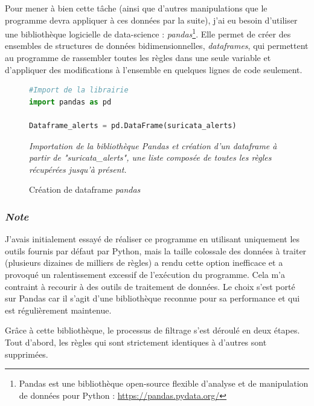 \vspace{1em}

Pour mener à bien cette tâche (ainsi que d'autres manipulations que le programme devra appliquer à ces données par la suite), j'ai eu besoin d'utiliser une bibliothèque logicielle de data-science : \textit{pandas}\footnote{Pandas est une bibliothèque open-source flexible d'analyse et de manipulation de données pour Python : \url{https://pandas.pydata.org/}}. Elle permet de créer des ensembles de structures de données bidimensionnelles, \textit{dataframes}, qui permettent au programme de rassembler toutes les règles dans une seule variable et d'appliquer des modifications à l'ensemble en quelques lignes de code seulement.\\

\newpage

\begin{figure}[h]%
    \center%
\begin{lstlisting}[language=Python]
#Import de la librairie
import pandas as pd

Dataframe_alerts = pd.DataFrame(suricata_alerts)
\end{lstlisting}
    {\small
    \textit{Importation de la bibliothèque Pandas et création d'un \textit{dataframe} à partir de "suricata\_alerts", une liste composée de toutes les règles récupérées jusqu'à présent.}
    }
    \caption[Création de dataframe \textit{pandas}]{Création de dataframe \textit{pandas}}\label{fig:CreateDataf}
\end{figure}

\subsubsection{\textit{Note}}
J'avais initialement essayé de réaliser ce programme en utilisant uniquement les outils fournis par défaut par Python, mais la taille colossale des données à traiter (plusieurs dizaines de milliers de règles) a rendu cette option inefficace et a provoqué un ralentissement excessif de l'exécution du programme. Cela m'a contraint à recourir à des outils de traitement de données. Le choix s'est porté sur Pandas car il s'agit d'une bibliothèque reconnue pour sa performance et qui est régulièrement maintenue.\\

\vspace{0.5em}

Grâce à cette bibliothèque, le processus de filtrage s'est déroulé en deux étapes. Tout d'abord, les règles qui sont strictement identiques à d'autres sont supprimées.\\

